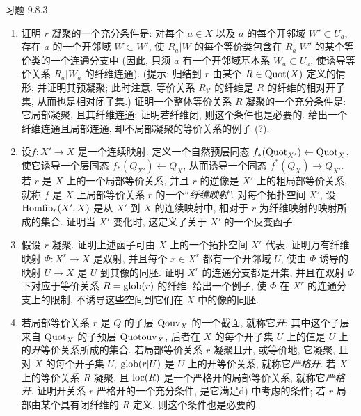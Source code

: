 \begin{enonce*}[remark]{习题 9.8.3}
\begin{enumerate}
\item 证明 $r$ 凝聚的一个充分条件是:
对每个 $a\in X$ 以及 $a$ 的每个开邻域 $W'\subset U_a$,
存在 $a$ 的一个开邻域 $W\subset W'$,
使 $R_a|W$ 的每个等价类包含在 $R_a|W'$ 的某个等价类的一个连通分支中
(因此, 只须 $a$ 有一个开邻域基本系 $W_a\subset U_a$,
使诱导等价关系 $R_a|W_a$ 的纤维连通).
(提示: 归结到 $r$ 由某个 $R\in\operatorname{Quot}(X)$ 定义的情形,
并证明其预凝聚;
此时注意, 等价关系 $R_{𝒱}$ 的纤维是 $R$ 的纤维的相对开子集,
从而也是相对闭子集.)
证明一个整体等价关系 $R$ 凝聚的一个充分条件是:
它局部凝聚, 且其纤维连通;
证明若纤维闭, 则这个条件也是必要的.
给出一个纤维连通且局部连通, 却不局部凝聚的等价关系的例子 (?).

\item 设\pageoriginale $f:X'\rightarrow X$ 是一个连续映射.
定义一个自然预层同态
$f_{\ast}(\operatorname{Quot}_{X'})\leftarrow\operatorname{Quot}_X$,
使它诱导一个层同态 $f_{\ast}(Q_{X'})\leftarrow Q_X$,
从而诱导一个同态 $f^{\ast}(Q_X)\rightarrow Q_{X'}$.
若 $r$ 是 $X$ 上的一个局部等价关系,
并且 $r$ 的逆像是 $X'$ 上的粗局部等价关系,
就称 $f$ 是 $X$ 上局部等价关系 $r$ 的一个“\emph{纤维映射}”.
对每个拓扑空间 $X'$,
设 $\operatorname{Homfib}_r(X',X)$ 是从 $X'$ 到 $X$ 的连续映射中,
相对于 $r$ 为纤维映射的映射所成的集合.
证明当 $X'$ 变化时, 这定义了关于 $X'$ 的一个反变函子.

\item 假设 $r$ 凝聚.
证明上述函子可由 $X$ 上的一个拓扑空间 $X^r$ 代表.
证明万有纤维映射 $\Phi:X^r\rightarrow X$ 是双射,
并且每个 $x\in X^r$ 都有一个开邻域 $U$,
使由 $\Phi$ 诱导的映射 $U\rightarrow X$ 是 $U$ 到其像的同胚.
证明 $X^r$ 的连通分支都是开集,
并且在双射 $\Phi$ 下对应于等价关系 $R=\operatorname{glob}(r)$ 的纤维.
给出一个例子, 使 $\Phi$ 在 $X^r$ 的连通分支上的限制,
不诱导这些空间到它们在 $X$ 中的像的同胚.

\item 若局部等价关系 $r$ 是 $Q$ 的子层 $\operatorname{Qouv}_X$ 的一个截面,
就称它\emph{开};
其中这个子层来自 $\operatorname{Quot}_X$ 的子预层 $\operatorname{Quotouv}_X$,
后者在 $X$ 的每个开子集 $U$ 上的值是 $U$ 上的\emph{开}等价关系所成的集合.
若局部等价关系 $r$ 凝聚且开,
或等价地, 它凝聚, 且对 $X$ 的每个开子集 $U$,
$\operatorname{glob}(r|U)$ 是 $U$ 上的开等价关系,
就称它\emph{严格开}.
若 $X$ 上的等价关系 $R$ 凝聚,
且 $\operatorname{loc}(R)$ 是一个严格开的局部等价关系,
就称它\emph{严格开}.
证明开关系 $r$ 严格开的一个充分条件,
是它满足\pageoriginale d) 中考虑的条件;
若 $r$ 局部由某个具有闭纤维的 $R$ 定义,
则这个条件也是必要的.


\end{enumerate}
\end{enonce*}

